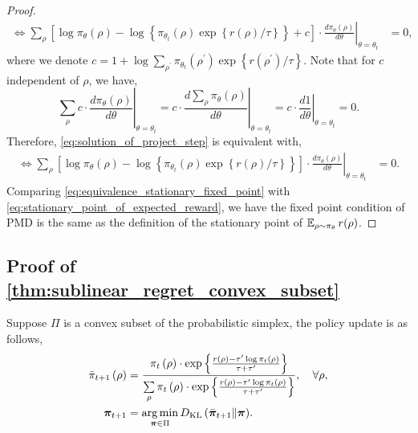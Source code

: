 \begin{proof}
\begin{equation}
\begin{split}
		\iff \left. \sum\limits_{\rho}{ \left[ \log{\pi_\theta(\rho)} - \log\left\{\pi_{\theta_t}(\rho) \exp\left\{r(\rho) / \tau\right\} \right\} + c \right] \cdot \frac{d \pi_{\theta}(\rho)}{d \theta} } \right\vert_{\theta = \theta_t} &= 0,
	\end{split}
	\end{equation}
	where we denote $c = 1 + \log{ \sum\limits_{\rho^\prime}{\pi_{\theta_t}(\rho^\prime) \exp\left\{r(\rho^\prime) / \tau\right\} } }$. Note that for $c$ independent of $\rho$, we have,
	\begin{equation*}
		\left. \sum\limits_{\rho}{ c \cdot \frac{d \pi_{\theta}(\rho)}{d \theta} } \right\vert_{\theta = \theta_t} = c \cdot \left. \frac{d \sum_{\rho}{ \pi_{\theta}(\rho) }}{d \theta} \right\vert_{\theta = \theta_t} = c \cdot \left. \frac{d 1}{d \theta} \right\vert_{\theta = \theta_t} = 0.
	\end{equation*}
	Therefore, \cref{eq:solution_of_project_step} is equivalent with,
	\begin{equation}
	\label{eq:equivalence_stationary_fixed_point}
	\begin{split}
		\iff \left. \sum\limits_{\rho}{ \left[ \log{\pi_\theta(\rho)} - \log\left\{\pi_{\theta_t}(\rho) \exp\left\{r(\rho) / \tau\right\} \right\} \right] \cdot \frac{d \pi_{\theta}(\rho)}{d \theta} } \right\vert_{\theta = \theta_t} &= 0.
	\end{split}
	\end{equation}
	Comparing \cref{eq:equivalence_stationary_fixed_point} with \cref{eq:stationary_point_of_expected_reward}, we have the fixed point condition of PMD is the same as the definition of the stationary point of $\operatorname{\mathbb{E}}_{\rho \sim \pi_\theta}{  r(\rho)}$.
\end{proof}

\subsection{Proof of \cref{thm:sublinear_regret_convex_subset}}

Suppose $\Pi$ is a convex subset of the probabilistic simplex, the policy update is as follows,
\begin{align*}
    \bar{\pi}_{t+1}\left( \rho \right) &= \frac{\pi_t\left( \rho \right) \cdot \exp\left\{ \frac{r\left( \rho \right) - \tau^\prime \log{\pi_t\left( \rho \right)}}{\tau + \tau^\prime} \right\}}{ \sum\limits_{\rho}{ \pi_t\left( \rho \right) \cdot \exp\left\{ \frac{r\left( \rho \right) - \tau^\prime \log{\pi_t\left( \rho \right)}}{\tau + \tau^\prime} \right\} } }, \quad \forall \rho, \\
    {\boldsymbol{\pi}}_{t+1} &= \operatorname*{arg\,min}\limits_{{\boldsymbol{\pi}} \in \Pi}{ D_{\mathrm{KL}}\left( \bar{{\boldsymbol{\pi}}}_{t+1} \middle\| {\boldsymbol{\pi}} \right) }.
\end{align*}

